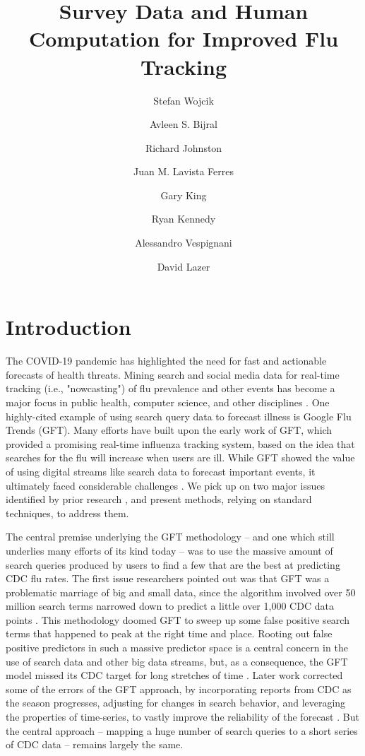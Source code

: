 \documentclass[fleqn,10pt]{wlscirep}
\title{Survey Data and Human Computation for Improved Flu Tracking}
\author[a,*,+]{Stefan Wojcik}
\author[b,+]{Avleen S. Bijral}
\author[b]{Richard Johnston}
\author[b]{Juan M. Lavista Ferres}
\author[c]{Gary King}
\author[d]{Ryan Kennedy}
\author[e]{Alessandro Vespignani}
\author[c, e]{David Lazer}
\affil[a]{Twitter}
\affil[*]{swojcik@twitter.com}
\affil[b]{Microsoft}
\affil[c]{Harvard University}
\affil[d]{University of Houston}
\affil[e]{Northeastern University}
\affil[+]{these authors contributed equally to this work}
\begin{document}
\flushbottom
\maketitle
%
%

\section*{Introduction}

The COVID-19 pandemic has highlighted the need for fast and actionable forecasts of health threats. Mining search and social media data for real-time tracking (i.e., "nowcasting") of flu prevalence and other events has become a major focus in public health, computer science, and other disciplines \cite{ginsberg_etal_2009,culotta2010towards,salathe2012digital,bodnar2013validating,nsoesie2014guess,generous2014global,althouse2015enhancing,yang_etal_2015inference,yang_etal_2015,santillana2016perspectives}. One highly-cited example of using search query data to forecast illness is Google Flu Trends (GFT). Many efforts have built upon the early work of GFT, which provided a promising real-time influenza tracking system, based on the idea that searches for the flu will increase when users are ill. While GFT showed the value of using digital streams like search data to forecast important events, it ultimately faced considerable challenges \cite{ginsberg_etal_2009,butler_2013,lazer_etal_2014}. We pick up on two major issues identified by prior research \cite{lazer_etal_2014}, and present methods, relying on standard techniques, to address them. 

The central premise underlying the GFT methodology -- and one which still underlies many efforts of its kind today -- was to use the massive amount of search queries produced by users to find a few that are the best at predicting CDC flu rates. The first issue researchers pointed out was that GFT was a problematic marriage of big and small data, since the algorithm involved over 50 million search terms narrowed down to predict a little over 1,000 CDC data points \cite{lazer_etal_2014}. This methodology doomed GFT to sweep up some false positive search terms that happened to peak at the right time and place. Rooting out false positive predictors in such a massive predictor space is a central concern in the use of search data and other big data streams, but, as a consequence, the GFT model missed its CDC target for long stretches of time \cite{lazer_etal_2014}. Later work corrected some of the errors of the GFT approach, by incorporating reports from CDC as the season progresses, adjusting for changes in search behavior, and leveraging the properties of time-series, to vastly improve the reliability of the forecast \cite{yang_etal_2015}. But the central approach -- mapping a huge number of search queries to a short series of CDC data -- remains largely the same. 
\end{document}
